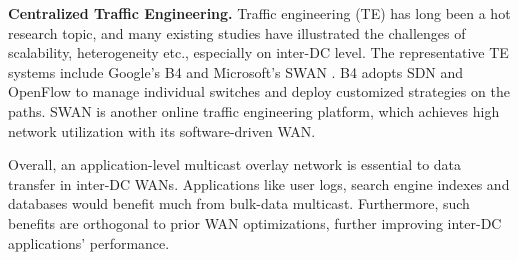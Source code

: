 \textbf{Centralized Traffic Engineering.} Traffic engineering (TE) has long been a hot research topic, and many existing studies \cite{chen2012design, kavulya2010analysis, mishra2010towards, reiss2012heterogeneity, sharma2011modeling, More, zhang2011characterizing} have illustrated the challenges of scalability, heterogeneity etc., especially on inter-DC level. The representative TE systems include Google's B4 \cite{jain2013b4} and Microsoft's SWAN \cite{hong2013achieving}. B4 adopts SDN \cite{mckeown2009software} and OpenFlow \cite{OpenFlow,mckeown2008openflow} to manage individual switches and deploy customized strategies on the paths. SWAN is another online traffic engineering platform, which achieves high network utilization with its software-driven WAN. %

Overall, an application-level multicast overlay network is essential to data transfer in inter-DC WANs. Applications like user logs, search engine indexes and databases would benefit much from bulk-data multicast. Furthermore, such benefits are orthogonal to prior WAN optimizations, further improving inter-DC applications' performance.

